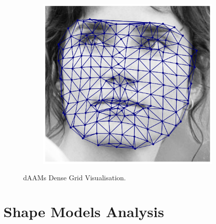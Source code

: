 \begin{figure}[!h]
\begin{subfigure}[b]{0.115\textwidth}
    \end{subfigure}
    \begin{subfigure}[b]{0.115\textwidth}
            \includegraphics[height=1\textwidth]{supports/Fittings/fitting_face_0023}
    \end{subfigure}
\caption{dAAMs Dense Grid Visualisation.}
\label{fig:fr}
\end{figure}

\section{Shape Models Analysis}
\label{sec:modelanalysis}

